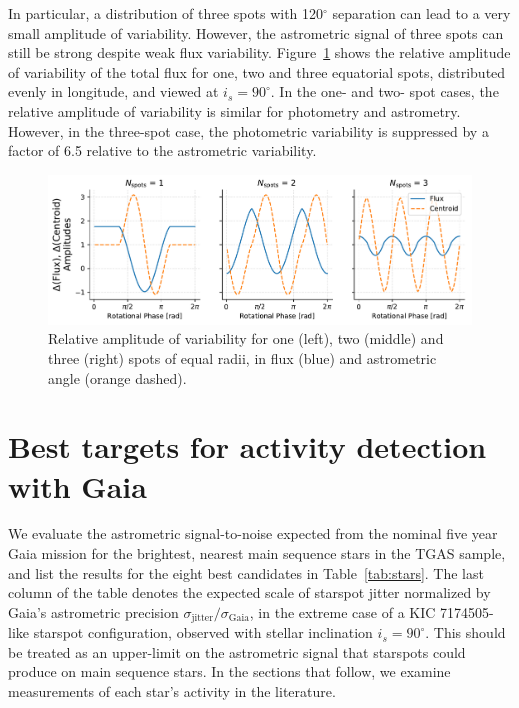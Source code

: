 In particular, a distribution of three spots with 120$^\circ$ separation
can lead to a very small amplitude of variability.  However, the
astrometric signal of three spots can still be strong despite weak
flux variability. Figure~\ref{fig:photo_vs_astro} shows the relative 
amplitude of variability of the total flux for one, two and three equatorial
spots, distributed evenly in longitude, and viewed at $i_s = 90^\circ$.  In the one- and two- spot cases, the relative
amplitude of variability is similar for photometry and astrometry.
However, in the three-spot case, the photometric variability is
suppressed by a factor of 6.5 relative to the astrometric variability.

\begin{figure}
    \centering
    \includegraphics[scale=0.75]{gaia/n_spots.pdf}
    \caption{Relative amplitude of variability for one (left),
    two (middle) and three (right) spots of equal radii, in flux (blue)
    and astrometric angle (orange dashed).}
    \label{fig:photo_vs_astro}
\end{figure}

\section{Best targets for activity detection with Gaia} \label{sec:targets}

We evaluate the astrometric signal-to-noise expected from the nominal five year Gaia mission for the brightest, nearest main sequence stars in the TGAS sample, and list the results for the eight best candidates in Table~\ref{tab:stars}. The last column of the table denotes the expected scale of starspot jitter normalized by Gaia's astrometric precision $\sigma_{\mathrm{jitter}}/\sigma_{\mathrm{Gaia}}$, in the extreme case of a KIC 7174505-like starspot configuration, observed with stellar inclination $i_s = 90^\circ$. This should be treated as an upper-limit on the astrometric signal that starspots could produce on main sequence stars. In the sections that follow, we examine measurements of each star's activity in the literature.

